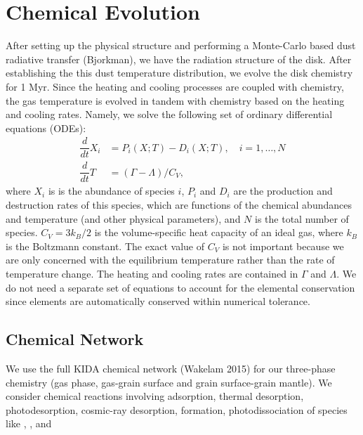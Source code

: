 \section{Chemical Evolution}
After setting up the physical structure and performing a Monte-Carlo based dust radiative transfer (Bjorkman), we have the radiation structure of the disk. After establishing the this dust temperature distribution, we evolve the disk chemistry for 1 Myr. Since the heating and cooling processes are coupled with chemistry, the gas temperature is evolved in tandem with chemistry based on the heating and cooling rates. Namely, we solve the following set of ordinary differential equations (ODEs):
\begin{equation}
	\begin{split}
		\dfrac{d}{dt} X_i &= P_i (X;T) - D_i (X;T), \quad i = 1, \dots, N \\
		\dfrac{d}{dt} T &= (\Gamma - \Lambda) / C_V,
	\end{split}
\end{equation}
where $X_i$ is is the abundance of species $i$, $P_i$ and $D_i$ are the production and destruction rates of this species, which are functions of the chemical abundances and temperature (and other physical parameters), and $N$ is the total number of species. $C_V = 3k_B/2$ is the volume-specific heat capacity of an ideal gas, where $k_B$ is the Boltzmann constant. The exact value of $C_V$ is not important because we are only concerned with the equilibrium temperature rather than the rate of temperature change. The heating and cooling rates are contained in $\Gamma$ and $\Lambda$. We do not need a separate set of equations to account for the elemental conservation since elements are automatically conserved within numerical tolerance.
\subsection{Chemical Network}
We use the full KIDA chemical network (Wakelam 2015) for our three-phase chemistry (gas phase, gas-grain surface and grain surface-grain mantle). We consider chemical reactions involving adsorption, thermal desorption, photodesorption, cosmic-ray desorption,  formation, photodissociation of species like , ,  and 
